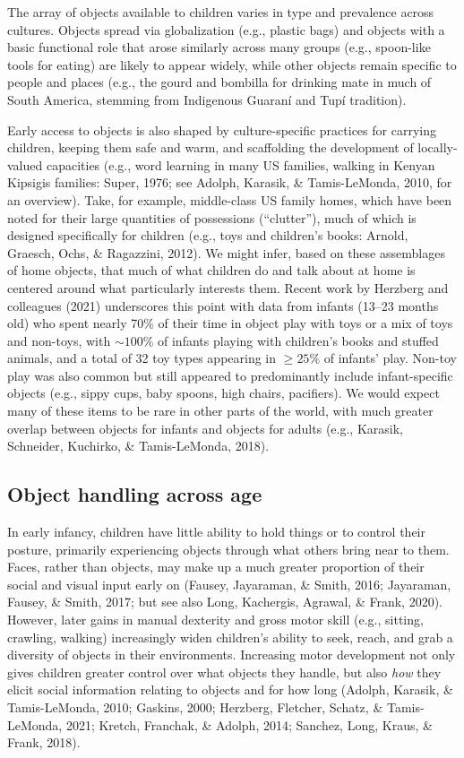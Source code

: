 \documentclass[10pt, letterpaper]{article}
\begin{document}
The array of objects available to children varies in type and prevalence
across cultures. Objects spread via globalization (e.g., plastic bags)
and objects with a basic functional role that arose similarly across
many groups (e.g., spoon-like tools for eating) are likely to appear
widely, while other objects remain specific to people and places (e.g.,
the gourd and bombilla for drinking mate in much of South America,
stemming from Indigenous Guaraní and Tupí tradition).

Early access to objects is also shaped by culture-specific practices for
carrying children, keeping them safe and warm, and scaffolding the
development of locally-valued capacities (e.g., word learning in many US
families, walking in Kenyan Kipsigis families: Super, 1976; see Adolph,
Karasik, \& Tamis-LeMonda, 2010, for an overview). Take, for example,
middle-class US family homes, which have been noted for their large
quantities of possessions (``clutter''), much of which is designed
specifically for children (e.g., toys and children's books: Arnold,
Graesch, Ochs, \& Ragazzini, 2012). We might infer, based on these
assemblages of home objects, that much of what children do and talk
about at home is centered around what particularly interests them.
Recent work by Herzberg and colleagues (2021) underscores this point
with data from infants (13--23 months old) who spent nearly 70\% of
their time in object play with toys or a mix of toys and non-toys, with
\({\sim}100\%\) of infants playing with children's books and stuffed
animals, and a total of 32 toy types appearing in \({\ge}25\%\) of
infants' play. Non-toy play was also common but still appeared to
predominantly include infant-specific objects (e.g., sippy cups, baby
spoons, high chairs, pacifiers). We would expect many of these items to
be rare in other parts of the world, with much greater overlap between
objects for infants and objects for adults (e.g., Karasik, Schneider,
Kuchirko, \& Tamis-LeMonda, 2018).

\hypertarget{object-handling-across-age}{%
\subsection{Object handling across
age}\label{object-handling-across-age}}

In early infancy, children have little ability to hold things or to
control their posture, primarily experiencing objects through what
others bring near to them. Faces, rather than objects, may make up a
much greater proportion of their social and visual input early on
(Fausey, Jayaraman, \& Smith, 2016; Jayaraman, Fausey, \& Smith, 2017;
but see also Long, Kachergis, Agrawal, \& Frank, 2020). However, later
gains in manual dexterity and gross motor skill (e.g., sitting,
crawling, walking) increasingly widen children's ability to seek, reach,
and grab a diversity of objects in their environments. Increasing motor
development not only gives children greater control over what objects
they handle, but also \emph{how} they elicit social information relating
to objects and for how long (Adolph, Karasik, \& Tamis-LeMonda, 2010;
Gaskins, 2000; Herzberg, Fletcher, Schatz, \& Tamis-LeMonda, 2021;
Kretch, Franchak, \& Adolph, 2014; Sanchez, Long, Kraus, \& Frank,
2018).
\end{document}
